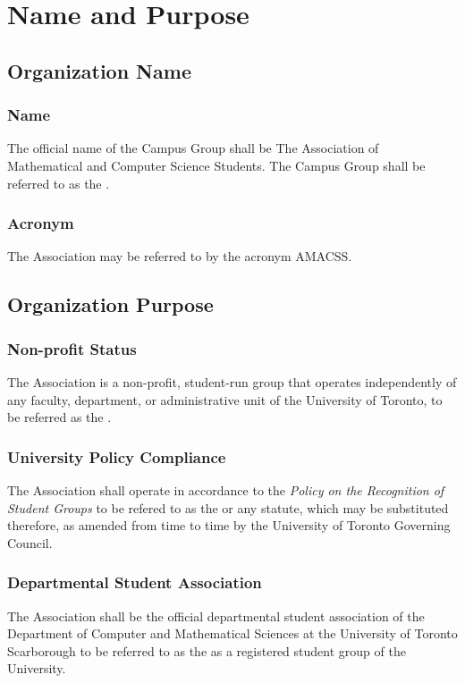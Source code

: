\chapter{Name and Purpose}

\section{Organization Name}

\subsection{Name}
The official name of the Campus Group shall be The Association of 
Mathematical and Computer Science Students. The Campus Group 
shall be referred to as the .

\subsection{Acronym}
The Association may be referred to by the acronym AMACSS.


\section{Organization Purpose}

\subsection{Non-profit Status}
The Association is a non-profit, student-run group that operates 
independently of any faculty, department, or administrative unit of 
the University of Toronto, to be referred as the .

\subsection{University Policy Compliance}
The Association shall operate in accordance to the 
\emph{Policy on the Recognition of Student Groups}\textemdash 
to be refered to as the \textemdash 
or any statute, which may be substituted therefore, as amended from
time to time by the University of Toronto Governing Council.

\subsection{Departmental Student Association}
The Association shall be the official departmental student
association of the Department of Computer and Mathematical Sciences 
at the University of Toronto Scarborough\textemdash 
to be referred to as the \textemdash 
as a registered student group of the University.

